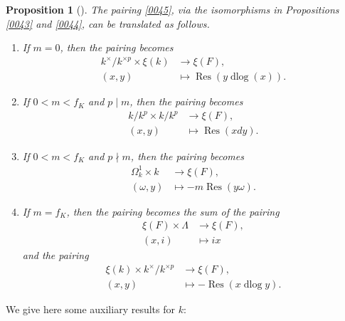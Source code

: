 \documentclass{amsart}
\newtheorem{Prop}[Thm]{Proposition}
\theoremstyle{remark}
\numberwithin{equation}{subsection}
\DeclareMathOperator{\Res}{Res}
\DeclareMathOperator{\dlog}{dlog}
\begin{document}
\begin{Prop}[{\cite[\S 6]{Kat79}}] \label{0046}
	The pairing \eqref{0045},
	via the isomorphisms in
	Propositions \ref{0043}
	and \ref{0044},
	can be translated as follows.
	\begin{enumerate}
		\item \label{0185}
			If $m = 0$, then the pairing becomes
				\begin{align*}
							k^{\times} / k^{\times p} \times \xi(k)
					&	\to
							\xi(F),
					\\
							(x, y)
					&	\mapsto
							\Res(y \dlog(x)).
				\end{align*}
		\item \label{0186}
			If $0 < m < f_{K}$ and $p \mid m$, then the pairing becomes
				\begin{align*}
							k / k^{p} \times k / k^{p}
					&	\to
							\xi(F),
					\\
							(x, y)
					&	\mapsto
							\Res(x d y).
				\end{align*}
		\item \label{0187}
			If $0 < m < f_{K}$ and $p \nmid m$, then the pairing becomes
				\begin{align*}
							\Omega_{k}^{1} \times k
					&	\to
							\xi(F),
					\\
							(\omega, y)
					&	\mapsto
							- m \Res(y \omega).
				\end{align*}
		\item \label{0188}
			If $m = f_{K}$, then the pairing becomes the sum of the pairing
				\begin{align*}
							\xi(F) \times \Lambda
					&	\to
							\xi(F),
					\\
							(x, i)
					&	\mapsto
							i x
				\end{align*}
			and the pairing
				\begin{align*}
							\xi(k) \times k^{\times} / k^{\times p}
					&	\to
							\xi(F),
					\\
							(x, y)
					&	\mapsto
							- \Res(x \dlog y).
				\end{align*}
	\end{enumerate}
\end{Prop}

We give here some auxiliary results for $k$:
\end{document}
